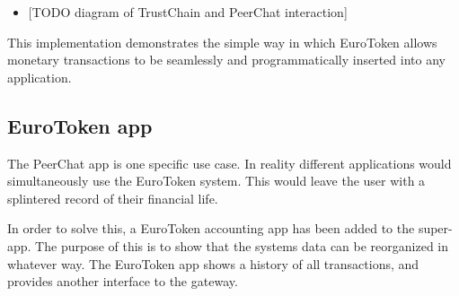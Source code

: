 \documentclass[whitelogo]{tudelft-report}
\providecommand{\tightlist}{%
  \setlength{\itemsep}{0pt}\setlength{\parskip}{0pt}}
\begin{document}
\begin{itemize}
\tightlist
\item
  {[}TODO diagram of TrustChain and PeerChat interaction{]}
\end{itemize}

This implementation demonstrates the simple way in which EuroToken
allows monetary transactions to be seamlessly and programmatically
inserted into any application.

\subsection{EuroToken app}\label{eurotoken-app}

The PeerChat app is one specific use case. In reality different
applications would simultaneously use the EuroToken system. This would
leave the user with a splintered record of their financial life.

In order to solve this, a EuroToken accounting app has been added to the
super-app. The purpose of this is to show that the systems data can be
reorganized in whatever way. The EuroToken app shows a history of all
transactions, and provides another interface to the gateway.
\end{document}

